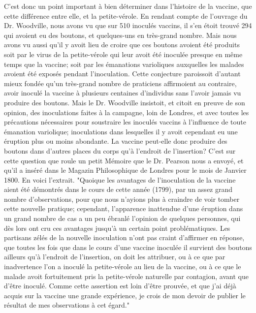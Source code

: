 C'est donc un point important à bien déterminer dans l'histoire de la vaccine, que cette différence entre elle, et la petite-vérole. En rendant compte de l'ouvrage du Dr. Woodville, nous avons vu que sur 510 inoculés\setcounter{page}{256} vaccins, il s'en étoit trouvé 294 qui avoient eu des boutons, et quelques-uns en très-grand nombre. Mais nous avons vu aussi qu'il y avoit lieu de croire que ces boutons avoient été produits soit par le virus de la petite-vérole qui leur avoit été inoculée presque en même temps que la vaccine; soit par les émanations varioliques auxquelles les malades avoient été exposés pendant l'inoculation. Cette conjecture paroissoit d'autant mieux fondée qu'un très-grand nombre de praticiens affirmoient au contraire, avoir inoculé la vaccine à plusieurs centaines d'individus sans l'avoir jamais vu produire des boutons. Mais le Dr. Woodville insistoit, et citoit en preuve de son opinion, des inoculations faites à la campagne, loin de Londres, et avec toutes les précautions nécessaires pour soustraire les inoculés vaccins à l'influence de toute émanation variolique; inoculations dans lesquelles il y avoit cependant eu une éruption plus ou moins abondante. La vaccine peut-elle donc produire des boutons dans d'autres places du corps qu'à l'endroit de l'insertion?
C'est sur cette question que roule un petit Mémoire que le Dr. Pearson nous a envoyé, et qu'il a inséré dans le Magazin Philosophique de Londres pour le mois de Janvier 1800. En voici l'extrait.
\setcounter{page}{257}
"Quoique les avantages de l'inoculation de la vaccine aient été démontrés dans le cours de cette année (1799), par un assez grand nombre d'observations, pour que nous n'ayions plus à craindre de voir tomber cette nouvelle pratique; cependant, l'apparence inattendue d'une éruption dans un grand nombre de cas a un peu ébranlé l'opinion de quelques personnes, qui dès lors ont cru ces avantages jusqu'à un certain point problématiques. Les partisans zélés de la nouvelle inoculation n'ont pas craint d'affirmer en réponse, que toutes les fois que dans le cours d'une vaccine inoculée il survient des boutons ailleurs qu'à l'endroit de l'insertion, on doit les attribuer, ou à ce que par inadvertence l'on a inoculé la petite-vérole au lieu de la vaccine, ou à ce que le malade avoit fortuitement pris la petite-vérole naturelle par contagion, avant que d'être inoculé. Comme cette assertion est loin d'être prouvée, et que j'ai déjà acquis sur la vaccine une grande expérience, je crois de mon devoir de publier le résultat de mes observations à cet égard."

